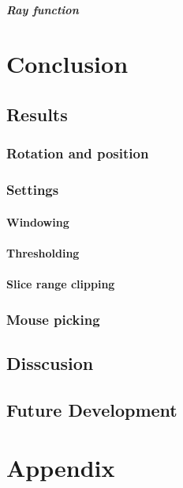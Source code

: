 \documentclass[english]{report}
\begin{document}
\paragraph{Ray function}

\chapter{Conclusion}
\section{Results}
\subsection{Rotation and position}
\subsection{Settings}
\subsubsection{Windowing}
\subsubsection{Thresholding}
\subsubsection{Slice range clipping}
\subsection{Mouse picking}

\section{Disscusion}

\section{Future Development}

\chapter{Appendix}
\end{document}
